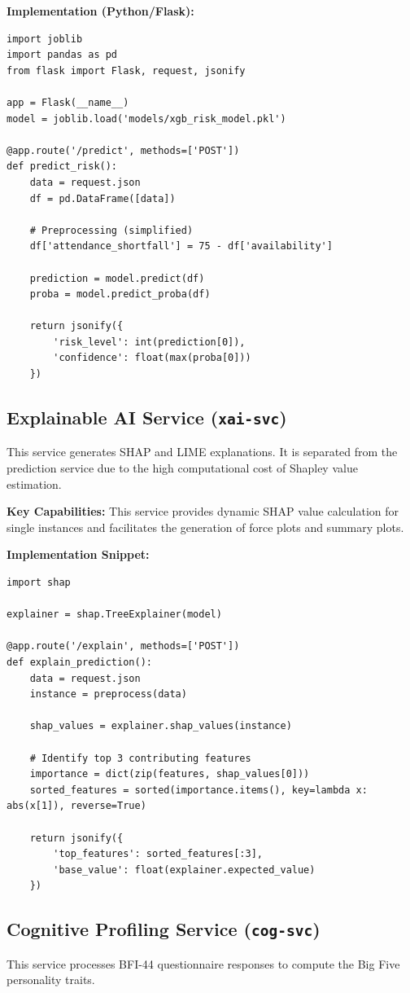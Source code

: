 \documentclass[12pt,a4paper]{report}
\begin{document}
\textbf{Implementation (Python/Flask):}
\begin{verbatim}
import joblib
import pandas as pd
from flask import Flask, request, jsonify

app = Flask(__name__)
model = joblib.load('models/xgb_risk_model.pkl')

@app.route('/predict', methods=['POST'])
def predict_risk():
    data = request.json
    df = pd.DataFrame([data])
    
    # Preprocessing (simplified)
    df['attendance_shortfall'] = 75 - df['availability']
    
    prediction = model.predict(df)
    proba = model.predict_proba(df)
    
    return jsonify({
        'risk_level': int(prediction[0]),
        'confidence': float(max(proba[0]))
    })
\end{verbatim}

\subsection{Explainable AI Service (\texttt{xai-svc})}
This service generates SHAP and LIME explanations. It is separated from the prediction service due to the high computational cost of Shapley value estimation.

\textbf{Key Capabilities:}
This service provides dynamic SHAP value calculation for single instances and facilitates the generation of force plots and summary plots.

\textbf{Implementation Snippet:}
\begin{verbatim}
import shap

explainer = shap.TreeExplainer(model)

@app.route('/explain', methods=['POST'])
def explain_prediction():
    data = request.json
    instance = preprocess(data)
    
    shap_values = explainer.shap_values(instance)
    
    # Identify top 3 contributing features
    importance = dict(zip(features, shap_values[0]))
    sorted_features = sorted(importance.items(), key=lambda x: abs(x[1]), reverse=True)
    
    return jsonify({
        'top_features': sorted_features[:3],
        'base_value': float(explainer.expected_value)
    })
\end{verbatim}

\subsection{Cognitive Profiling Service (\texttt{cog-svc})}
This service processes BFI-44 questionnaire responses to compute the Big Five personality traits.
\end{document}
